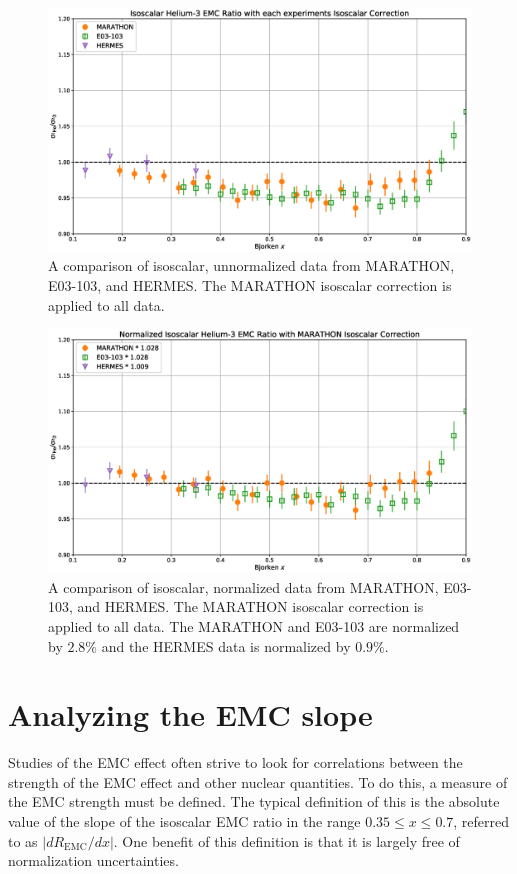 \begin{figure}[p]
	\includegraphics[width=\textwidth]{./results/fig/maraiso_comp.eps}
	\caption{A comparison of isoscalar, unnormalized data from MARATHON, E03-103, and HERMES. The MARATHON isoscalar correction is applied to all data.}
	\label{fig:maraisocomp}
\end{figure}

\begin{figure}[p]
	\includegraphics[width=\textwidth]{./results/fig/maraisonorm_comp.eps}
	\caption{A comparison of isoscalar, normalized data from MARATHON, E03-103, and HERMES. The MARATHON isoscalar correction is applied to all data. The MARATHON and E03-103 are normalized by $2.8\%$ and the HERMES data is normalized by $0.9\%$.}
	\label{fig:maraisonormcomp}
\end{figure}

\section{Analyzing the EMC slope}

Studies of the EMC effect often strive to look for correlations between the strength of the EMC effect and other nuclear quantities. To do this, a measure of the EMC strength must be defined. The typical definition of this is the absolute value of the slope of the isoscalar EMC ratio in the range $0.35 \leq x \leq 0.7$, referred to as $\left|dR_{\text{EMC}}/dx\right|$. One benefit of this definition is that it is largely free of normalization uncertainties. 

